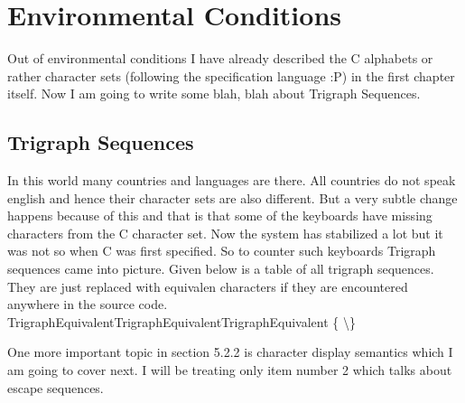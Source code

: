 \section{Environmental Conditions}
Out of environmental conditions I have already described the C
alphabets or rather character sets (following the specification
language :P) in the first chapter itself. Now I am going to write some
blah, blah about Trigraph Sequences.

\subsection{Trigraph Sequences}
In this world many countries and languages are there. All countries do
not speak english and hence their character sets are also
different. But a very subtle change happens because of this and that is
that some of the keyboards have missing characters from the C
character set. Now the system has stabilized a lot but it was not so
when C was first specified. So to counter such keyboards Trigraph
sequences came into picture. Given below is a table of all trigraph
sequences. They are just replaced with equivalen characters if they
are encountered anywhere in the source code.
{\starttable[|c|c|c|c|c|c|]
\HL
\VL Trigraph\VL Equivalent\VL Trigraph\VL Equivalent\VL Trigraph\VL Equivalent\VL\SR
\HL
\VL{}\VL\type{#}\VL{}\VL\type{^}\VL{}\VL\type{|}\VL\FR
\HL
\VL {}\VL\type{[}\VL{}\VL\type{]}\VL {}\VL\{\VL\MR
\HL
\VL {}\VL\backslash\VL{}\VL\}\VL{}\VL\type{~}\VL\LR
\HL
\stoptable}

One more important topic in section 5.2.2 is character display
semantics which I am going to cover next. I will be treating only item
number 2 which talks about escape sequences.
